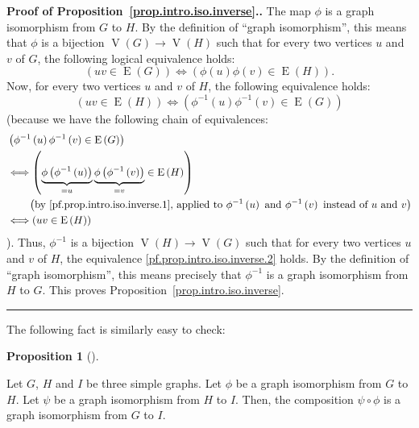 \documentclass[numbers=enddot,12pt,final,onecolumn,notitlepage]{scrartcl}%
\theoremstyle{definition}
\newtheorem{prop}[theo]{Proposition}
\newenvironment{proposition}[1][]
{\begin{prop}[#1]\begin{leftbar}}
{\end{leftbar}\end{prop}}
\newenvironment{proof}[1][Proof]{\noindent\textbf{#1.} }{\ \rule{0.5em}{0.5em}}
\newcommand{\tup}[1]{\left( #1 \right)}
\newcommand{\verts}[1]{\operatorname{V}\left( #1 \right)}
\newcommand{\edges}[1]{\operatorname{E}\left( #1 \right)}
\begin{document}
\begin{proof}[Proof of Proposition~\ref{prop.intro.iso.inverse}.]
The map $\phi$ is a graph isomorphism from $G$ to $H$. By the
definition of ``graph isomorphism'', this means that $\phi$ is a
bijection $\verts{G} \to \verts{H}$ such that for every two
vertices $u$ and $v$ of $G$, the following logical equivalence holds:
\begin{equation}
\left( uv \in \edges{G} \right)
\Longleftrightarrow
\left( \phi\tup{u}\phi\tup{v} \in \edges{H} \right) .
\label{pf.prop.intro.iso.inverse.1}
\end{equation}
Now, for every two vertices $u$ and $v$ of $H$, the following
equivalence holds:
\begin{equation}
\left( uv \in \edges{H} \right)
\Longleftrightarrow
\left( \phi^{-1}\tup{u}\phi^{-1}\tup{v} \in \edges{G} \right)
\label{pf.prop.intro.iso.inverse.2}
\end{equation}
(because we have the following chain of equivalences:
\begin{align*}
& \left( \phi^{-1}\tup{u}\phi^{-1}\tup{v} \in \edges{G} \right)
\\
& \Longleftrightarrow
\left( \underbrace{\phi\tup{\phi^{-1}\tup{u}}}_{=u}
   \underbrace{\phi\tup{\phi^{-1}\tup{v}}}_{=v} \in \edges{H} \right) \\
&\qquad
\left( \text{by \eqref{pf.prop.intro.iso.inverse.1}, applied to }
\phi^{-1}\tup{u} \text{ and } \phi^{-1}\tup{v} \text{ instead of } u
\text{ and } v \right) \\
& \Longleftrightarrow
\left( uv \in \edges{H} \right)
\end{align*}
). Thus, $\phi^{-1}$ is a bijection $\verts{H} \to \verts{G}$ such
that for every two vertices $u$ and $v$ of $H$, the equivalence
\eqref{pf.prop.intro.iso.inverse.2} holds. By the definition of
``graph isomorphism'', this means precisely that $\phi^{-1}$ is a
graph isomorphism from $H$ to $G$. This proves
Proposition~\ref{prop.intro.iso.inverse}.
\end{proof}

The following fact is similarly easy to check:

\begin{proposition} \label{prop.intro.iso.comp}
Let $G$, $H$ and $I$ be three simple graphs. Let $\phi$ be a graph
isomorphism from $G$ to $H$. Let $\psi$ be a graph isomorphism from
$H$ to $I$. Then, the composition $\psi \circ \phi$ is a graph
isomorphism from $G$ to $I$.
\end{proposition}
\end{document}

